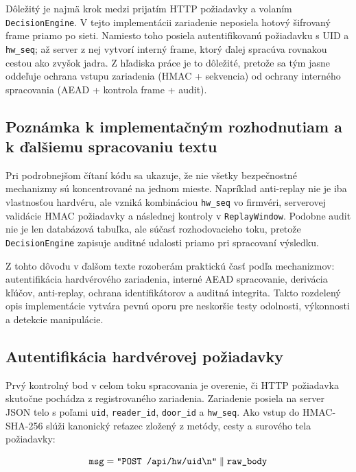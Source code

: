 \documentclass[journal,a4paper,onecolumn]{IEEEtran}
\begin{document}
Dôležitý je najmä krok medzi prijatím HTTP požiadavky a volaním \texttt{DecisionEngine}. V tejto implementácii zariadenie neposiela hotový šifrovaný frame priamo po sieti. Namiesto toho posiela autentifikovanú požiadavku s UID a \texttt{hw\_seq}; až server z nej vytvorí interný frame, ktorý ďalej spracúva rovnakou cestou ako zvyšok jadra. Z hľadiska práce je to dôležité, pretože sa tým jasne oddeľuje ochrana vstupu zariadenia (HMAC + sekvencia) od ochrany interného spracovania (AEAD + kontrola frame + audit).

\subsection{Poznámka k implementačným rozhodnutiam a k ďalšiemu spracovaniu textu}

Pri podrobnejšom čítaní kódu sa ukazuje, že nie všetky bezpečnostné mechanizmy sú koncentrované na jednom mieste. Napríklad anti-replay nie je iba vlastnosťou hardvéru, ale vzniká kombináciou \texttt{hw\_seq} vo firmvéri, serverovej validácie HMAC požiadavky a následnej kontroly v \texttt{ReplayWindow}. Podobne audit nie je len databázová tabuľka, ale súčasť rozhodovacieho toku, pretože \texttt{DecisionEngine} zapisuje auditné udalosti priamo pri spracovaní výsledku.

Z tohto dôvodu v ďalšom texte rozoberám praktickú časť podľa mechanizmov: autentifikácia hardvérového zariadenia, interné AEAD spracovanie, derivácia kľúčov, anti-replay, ochrana identifikátorov a auditná integrita. Takto rozdelený opis implementácie vytvára pevnú oporu pre neskoršie testy odolnosti, výkonnosti a detekcie manipulácie.

\subsection{Autentifikácia hardvérovej požiadavky}

Prvý kontrolný bod v celom toku spracovania je overenie, či HTTP požiadavka skutočne pochádza z registrovaného zariadenia. Zariadenie posiela na server JSON telo s poľami \texttt{uid}, \texttt{reader\_id}, \texttt{door\_id} a \texttt{hw\_seq}. Ako vstup do HMAC-SHA-256 slúži kanonický reťazec zložený z metódy, cesty a surového tela požiadavky:

\begin{equation}
\texttt{msg} = \texttt{\char34 POST /api/hw/uid\textbackslash n\char34} \parallel \texttt{raw\_body}
\end{equation}
\end{document}
